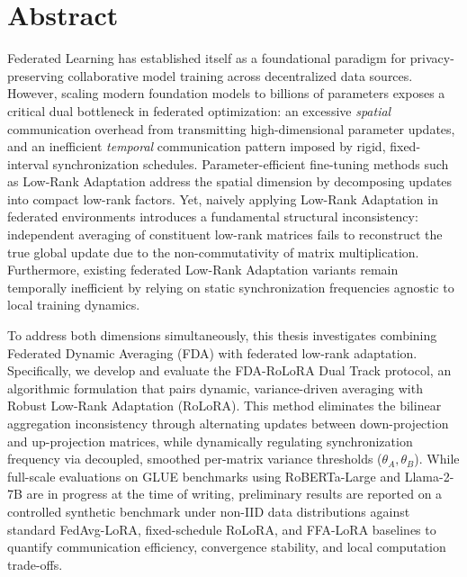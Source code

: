 \chapter*{Abstract}

Federated Learning has established itself as a foundational paradigm for privacy-preserving collaborative model training across decentralized data sources. However, scaling modern foundation models to billions of parameters exposes a critical dual bottleneck in federated optimization: an excessive \emph{spatial} communication overhead from transmitting high-dimensional parameter updates, and an inefficient \emph{temporal} communication pattern imposed by rigid, fixed-interval synchronization schedules. Parameter-efficient fine-tuning methods such as Low-Rank Adaptation address the spatial dimension by decomposing updates into compact low-rank factors. Yet, naively applying Low-Rank Adaptation in federated environments introduces a fundamental structural inconsistency: independent averaging of constituent low-rank matrices fails to reconstruct the true global update due to the non-commutativity of matrix multiplication. Furthermore, existing federated Low-Rank Adaptation variants remain temporally inefficient by relying on static synchronization frequencies agnostic to local training dynamics.

To address both dimensions simultaneously, this thesis investigates combining Federated Dynamic Averaging (FDA) with federated low-rank adaptation. Specifically, we develop and evaluate the FDA-RoLoRA Dual Track protocol, an algorithmic formulation that pairs dynamic, variance-driven averaging with Robust Low-Rank Adaptation (RoLoRA). This method eliminates the bilinear aggregation inconsistency through alternating updates between down-projection and up-projection matrices, while dynamically regulating synchronization frequency via decoupled, smoothed per-matrix variance thresholds ($\theta_A, \theta_B$). While full-scale evaluations on GLUE benchmarks using RoBERTa-Large and Llama-2-7B are in progress at the time of writing, preliminary results are reported on a controlled synthetic benchmark under non-IID data distributions against standard FedAvg-LoRA, fixed-schedule RoLoRA, and FFA-LoRA baselines to quantify communication efficiency, convergence stability, and local computation trade-offs.



